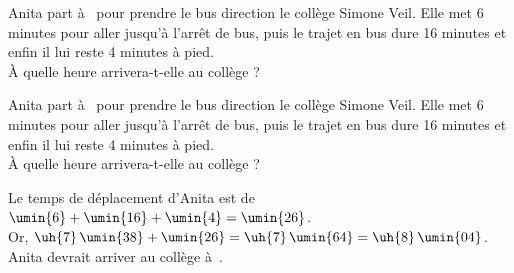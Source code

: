 \begin{exercice}
    Anita part à \, pour prendre le bus direction le collège Simone Veil. Elle met 6 minutes pour aller jusqu'à l'arrêt de bus, puis le trajet en bus dure 16 minutes et enfin il lui reste 4 minutes à pied. \\
    À quelle heure arrivera-t-elle au collège ?

 \end{exercice}
 
 \begin{corrige}
    Anita part à \, pour prendre le bus direction le collège Simone Veil. Elle met 6 minutes pour aller jusqu'à l'arrêt de bus, puis le trajet en bus dure 16 minutes et enfin il lui reste 4 minutes à pied. \\
    À quelle heure arrivera-t-elle au collège ?

    {\red 
    Le temps de déplacement d'Anita est de \\
    $\umin{6}+\umin{16}+\umin{4} =\umin{26}$. \\
    Or, $\uh{7}\,\umin{38}+\umin{26} =\uh{7}\,\umin{64} =\uh{8}\,\umin{04}$. \\
    Anita devrait arriver au collège à \,.
    }
 \end{corrige}